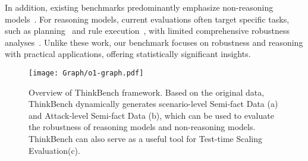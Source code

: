 

In addition, existing benchmarks predominantly emphasize non-reasoning models~\citep{li2023alpacaeval, hendrycks2020measuring, huang2024lateval, li2024llms}.
For reasoning models, current evaluations often target specific tasks, such as planning~\citep{wang2024planning} and rule execution~\citep{gui2024logicgame}, with limited comprehensive robustness analyses~\citep{zhong2024evaluation}. Unlike these work, our benchmark focuses on robustness and reasoning with practical applications, offering statistically significant insights.

\begin{figure*}[t]
    \centering
    \texttt{[image: Graph/o1-graph.pdf]}
    \caption{Overview of ThinkBench framework. Based on the original data, ThinkBench dynamically generates scenario-level Semi-fact Data (a) and Attack-level Semi-fact Data (b), which can be used to evaluate the robustness of reasoning models and non-reasoning models. ThinkBench can also serve as a useful tool for Test-time Scaling Evaluation(c). 
    }
    \label{fig:framework}
\end{figure*}

